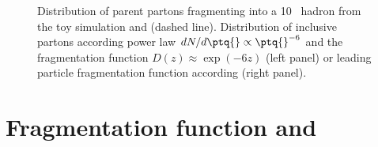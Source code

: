 \begin{figure}[htbp]
   \centering
   \caption{Distribution of parent partons fragmenting into a 10 \gevc\ hadron from the toy simulation and  (dashed line).
   Distribution of inclusive partons according power law $dN/d\ptq{}\propto\ptq{}^{-6}$ and the fragmentation function $D(z)\approx\exp(-6z)$ 
   (left panel) or leading particle fragmentation function according  (right panel).
   }  
   \label{fig:paret-child}
\end{figure}

\section{Fragmentation function and \kt{}}


